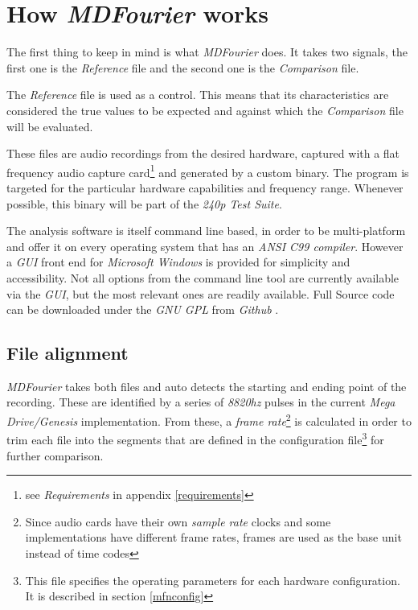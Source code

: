 \documentclass[10pt,a4paper]{report}
\begin{document}
\chapter{How \textit{MDFourier} works}
\label{howitworks}

The first thing to keep in mind is what \textit{MDFourier} does. It takes two signals, the first one is the \textit{Reference} file and the second one is the \textit{Comparison} file.

The \textit{Reference} file is used as a control. This means that its characteristics are considered the true values to be expected and against which the \textit{Comparison} file will be evaluated.

These files are audio recordings from the desired hardware, captured with a flat frequency audio capture card\footnote{see \textit{Requirements} in appendix \ref{requirements}} and generated by a custom binary. The program is targeted for the particular hardware capabilities and frequency range. Whenever possible, this binary will be part of the \textit{240p Test Suite}\cite{240pSuite}. 

The analysis software is itself command line based, in order to be multi-platform and offer it on every operating system that has an \textit{ANSI C99 compiler}. However a \textit{GUI} front end for \textit{Microsoft Windows} is provided for simplicity and accessibility. Not all options from the command line tool are currently available via the \textit{GUI}, but the most relevant ones are readily available. Full Source code can be downloaded under the \textit{GNU GPL} from \textit{Github} \cite{sourcecode}.

\section{File alignment}

\textit{MDFourier} takes both files and auto detects the starting and ending point of the recording. These are identified by a series of \textit{8820hz} pulses in the current \textit{Mega Drive/Genesis} implementation. From these, a \textit{frame rate}\footnote{Since audio cards have their own \textit{sample rate} clocks\cite{SoundCardClock} and some implementations have different frame rates, frames are used as the base unit instead of time codes} is calculated in order to trim each file into the segments that are defined in the configuration file\footnote{This file specifies the operating parameters for each hardware configuration. It is described in section \ref{mfnconfig}} for further comparison.
\end{document}

